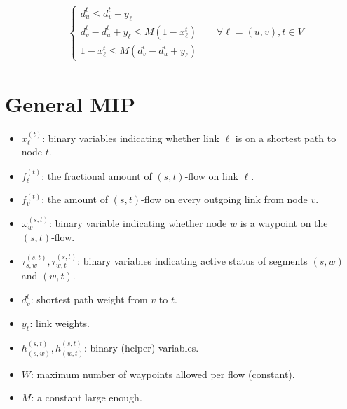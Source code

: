 \documentclass[a4paper,USenglish]{lipics-v2018}
\begin{document}
\begin{align}
&\begin{cases*}
d^{t}_u \leq d^{t}_v + y_{\ell} \\
d^{t}_v - d^{t}_u + y_{\ell} \leq M(1 - x^t_{\ell})	\\
1 - x^t_{\ell} \leq M(d^{t}_v - d^{t}_u + y_{\ell})
\end{cases*}
&& \forall \ell = (u,v),  t \in V
\label{LP:weights} 
\end{align}


\section{General MIP}
\begin{itemize}
\item	
	$x^{(t)}_{\ell}$:	binary variables indicating whether link $\ell$ is on a shortest path to node $t$.
\item	
	$f^{(t)}_{\ell}$: the fractional amount of $(s,t)$-flow on link $\ell$.
\item	
	$f^{(t)}_{v}$:  the amount of $(s,t)$-flow on every outgoing link from node $v$.
\item
	$\omega^{(s,t)}_{w}$: binary variable indicating whether node $w$ is a waypoint on the $(s,t)$-flow. 
\item $\tau^{(s,t)}_{s,w}, \tau^{(s,t)}_{w,t}$: binary variables indicating active status of segments $(s,w)$ and $(w,t)$.
\item
	$d^{t}_v$: shortest path weight from $v$ to $t$.
\item	
	$y_{\ell}$: link weights.
\item	
	$h^{(s,t)}_{(s,w)}, h^{(s,t)}_{(w,t)}$: binary (helper) variables.
\item
	$W$: maximum  number of waypoints allowed per flow (constant).
\item
	$M$: a constant large enough.	
\end{itemize}
\end{document}
